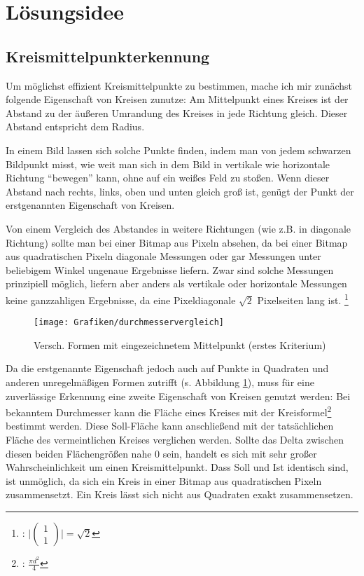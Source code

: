 \section{Lösungsidee}
\subsection{Kreismittelpunkterkennung}
Um möglichst effizient Kreismittelpunkte zu bestimmen, mache ich mir zunächst folgende Eigenschaft von Kreisen zunutze: Am Mittelpunkt eines Kreises ist der Abstand zu der äußeren Umrandung des Kreises in jede Richtung gleich. Dieser Abstand entspricht dem Radius.

In einem Bild lassen sich solche Punkte finden, indem man von jedem schwarzen Bildpunkt misst, wie weit man sich in dem Bild in vertikale wie horizontale Richtung "`bewegen"' kann, ohne auf ein weißes Feld zu stoßen. Wenn dieser Abstand nach rechts, links, oben und unten gleich groß ist, genügt der Punkt der erstgenannten Eigenschaft von Kreisen. 

Von einem Vergleich des Abstandes in weitere Richtungen (wie z.B. in diagonale Richtung) sollte man bei einer Bitmap aus Pixeln absehen, da bei einer Bitmap aus quadratischen Pixeln diagonale Messungen oder gar Messungen unter beliebigem Winkel ungenaue Ergebnisse liefern. 
Zwar sind solche Messungen prinzipiell möglich, liefern aber anders als vertikale oder horizontale Messungen keine ganzzahligen Ergebnisse, da eine Pixeldiagonale \(\sqrt{2}\) Pixelseiten lang ist.
\footnote{: \( \vert \begin{pmatrix}1\\1\end{pmatrix} \vert = \sqrt{2}\)}

\begin{figure}[!ht]
	\centering	
	\texttt{[image: Grafiken/durchmesservergleich]}
	\caption{Versch. Formen mit eingezeichnetem Mittelpunkt (erstes Kriterium)}
	\label{abb:mischformen}
\end{figure}

Da die erstgenannte Eigenschaft jedoch auch auf Punkte in Quadraten und anderen unregelmäßigen Formen zutrifft (s. Abbildung \ref{abb:mischformen}), muss für eine zuverlässige Erkennung eine zweite Eigenschaft von Kreisen genutzt werden: Bei bekanntem Durchmesser kann die Fläche eines Kreises mit der Kreisformel\footnote{: \(\frac{\pi d^2}{4}\)} bestimmt werden.
Diese Soll-Fläche kann anschließend mit der tatsächlichen Fläche des vermeintlichen Kreises verglichen werden. Sollte das Delta zwischen diesen beiden Flächengrößen nahe 0 sein, handelt es sich mit sehr großer Wahrscheinlichkeit um einen Kreismittelpunkt. 
Dass Soll und Ist identisch sind, ist unmöglich, da sich ein Kreis in einer Bitmap aus quadratischen Pixeln zusammensetzt. Ein Kreis lässt sich nicht aus Quadraten exakt zusammensetzen.


